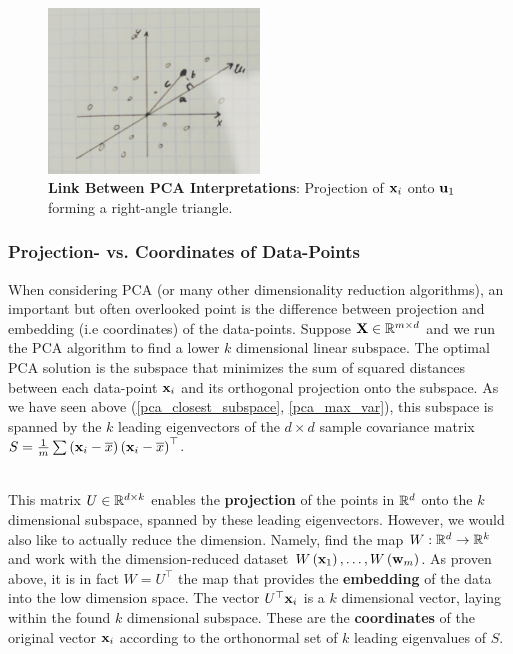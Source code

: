 \begin{figure}[!h]
	\centering
	\includegraphics[width=0.5\textwidth]{chapters/unsupervised.learning/figures/7.1.jpg}
	\caption{\textbf{Link Between PCA Interpretations}: Projection of $\mathbf{x}_i$ onto $\mathbf{u}_1$ forming a right-angle triangle.}\label{pca_interp_link}
\end{figure}

\subsubsection{Projection- vs. Coordinates of Data-Points}
When considering PCA (or many other dimensionality reduction algorithms), an important but often overlooked point is the difference between projection and embedding (i.e coordinates) of the data-points. Suppose $\mathbf{X}\in\mathbb{R}^{m\times d}$ and we run the PCA algorithm to find a lower $k$ dimensional linear subspace. The optimal PCA solution is the subspace that minimizes the sum of squared distances between each data-point $\mathbf{x}_i$ and its orthogonal projection onto the subspace. As we have seen above (\ref{pca_closest_subspace}, \ref{pca_max_var}), this subspace is spanned by the $k$ leading eigenvectors of the $d\times d$ sample covariance matrix $S=\frac{1}{m}\sum\left(\mathbf{x}_i-\overline{x}\right)\left(\mathbf{x}_i-\overline{x}\right)^\top$.

~\\This matrix $U\in\mathbb{R}^{d\times k}$ enables the \textbf{projection} of the points in $\mathbb{R}^d$ onto the $k$ dimensional subspace, spanned by these leading eigenvectors. However, we would also like to actually reduce the dimension. Namely, find the map $W:\mathbb{R}^d\rightarrow\mathbb{R}^k$ and work with the dimension-reduced dataset $W\left(\mathbf{x}_1\right),\ldots,W\left(\mathbf{w}_m\right)$. As proven above, it is in fact $W=U^\top$ the map that provides the \textbf{embedding} of the data into the low dimension space. The vector $U^\top \mathbf{x}_i$ is a $k$ dimensional vector, laying within the found $k$ dimensional subspace. These are the \textbf{coordinates} of the original vector $\mathbf{x}_i$ according to the orthonormal set of $k$ leading eigenvalues of $S$.

